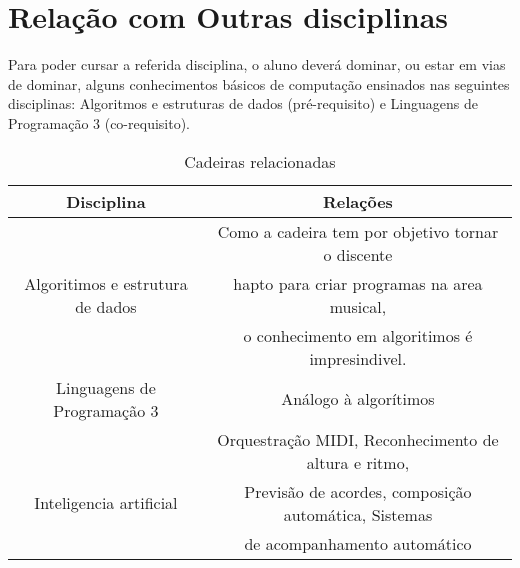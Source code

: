 \documentclass{article}
\begin{document}
\section{Relação com Outras disciplinas}
Para poder cursar a referida disciplina, o aluno deverá dominar, ou estar em vias de dominar, alguns conhecimentos básicos de computação ensinados nas seguintes disciplinas: Algoritmos e estruturas de dados (pré-requisito) e Linguagens de Programação 3 (co-requisito).
\begin{table}[h]
    \centering
    \begin{tabular}{c|c}
        Disciplina & Relações \\
        \hline
         & Como a cadeira tem por objetivo tornar o discente\\
        Algoritimos e estrutura de dados & hapto para criar programas na area musical,\\
          & o conhecimento em algoritimos é impresindivel.\\
        \hline
        Linguagens de Programação 3 & Análogo à algorítimos\\
        \hline
         & Orquestração MIDI, Reconhecimento de altura e ritmo,\\
        Inteligencia artificial & Previsão de acordes, composição automática, Sistemas\\
         & de acompanhamento automático
        
    \end{tabular}
    \caption{Cadeiras relacionadas \citep{sitedadisciplina}}
    \label{tab:my_label}
\end{table}



\end{document}
